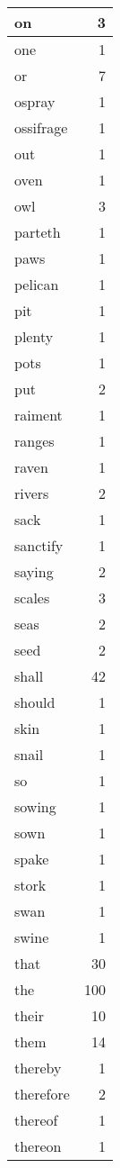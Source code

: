 \begin{center}
\begin{longtable}{l|r}
on & 3 \\ \hline
one & 1 \\ \hline
or & 7 \\ \hline
ospray & 1 \\ \hline
ossifrage & 1 \\ \hline
out & 1 \\ \hline
oven & 1 \\ \hline
owl & 3 \\ \hline
parteth & 1 \\ \hline
paws & 1 \\ \hline
pelican & 1 \\ \hline
pit & 1 \\ \hline
plenty & 1 \\ \hline
pots & 1 \\ \hline
put & 2 \\ \hline
raiment & 1 \\ \hline
ranges & 1 \\ \hline
raven & 1 \\ \hline
rivers & 2 \\ \hline
sack & 1 \\ \hline
sanctify & 1 \\ \hline
saying & 2 \\ \hline
scales & 3 \\ \hline
seas & 2 \\ \hline
seed & 2 \\ \hline
shall & 42 \\ \hline
should & 1 \\ \hline
skin & 1 \\ \hline
snail & 1 \\ \hline
so & 1 \\ \hline
sowing & 1 \\ \hline
sown & 1 \\ \hline
spake & 1 \\ \hline
stork & 1 \\ \hline
swan & 1 \\ \hline
swine & 1 \\ \hline
that & 30 \\ \hline
the & 100 \\ \hline
their & 10 \\ \hline
them & 14 \\ \hline
thereby & 1 \\ \hline
therefore & 2 \\ \hline
thereof & 1 \\ \hline
thereon & 1 \\ \hline

\end{longtable}
\end{center}
